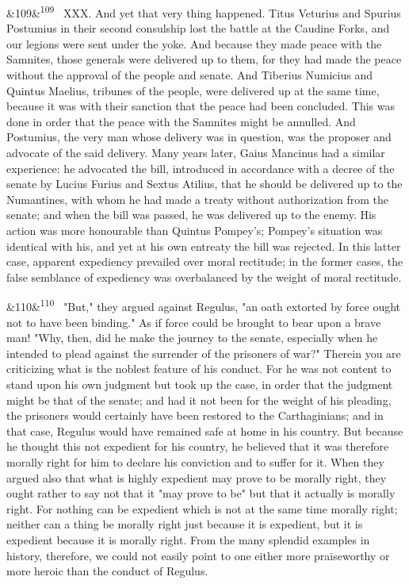 \documentclass[12pt]{article}
\newcommand{\para}[1][]{\par\noindent\ifx&#1&\else\textsuperscript{\footnotesize #1}~\fi}
\begin{document}
\para[109] XXX. And yet that very thing happened. Titus Veturius and Spurius Postumius in their second consulship lost the battle at the Caudine Forks, and our legions were sent under the yoke. And because they made peace with the Samnites, those generals were delivered up to them, for they had made the peace without the approval of the people and senate. And Tiberius Numicius and Quintus Maelius, tribunes of the people, were delivered up at the same time, because it was with their sanction that the peace had been concluded. This was done in order that the peace with the Samnites might be annulled. And Postumius, the very man whose delivery was in question, was the proposer and advocate of the said delivery. Many years later, Gaius Mancinus had a similar experience: he advocated the bill, introduced in accordance with a decree of the senate by Lucius Furius and Sextus Atilius, that he should be delivered up to the Numantines, with whom he had made a treaty without authorization from the senate; and when the bill was passed, he was delivered up to the enemy. His action was more honourable than Quintus Pompey's; Pompey's situation was identical with his, and yet at his own entreaty the bill was rejected. In this latter case, apparent expediency prevailed over moral rectitude; in the former cases, the false semblance of expediency was overbalanced by the weight of moral rectitude.

\para[110] "But," they argued against Regulus, "an oath extorted by force ought not to have been binding." As if force could be brought to bear upon a brave man! "Why, then, did he make the journey to the senate, especially when he intended to plead against the surrender of the prisoners of war?" Therein you are criticizing what is the noblest feature of his conduct. For he was not content to stand upon his own judgment but took up the case, in order that the judgment might be that of the senate; and had it not been for the weight of his pleading, the prisoners would certainly have been restored to the Carthaginians; and in that case, Regulus would have remained safe at home in his country. But because he thought this not expedient for his country, he believed that it was therefore morally right for him to declare his conviction and to suffer for it. When they argued also that what is highly expedient may prove to be morally right, they ought rather to say not that it "may prove to be" but that it actually is morally right. For nothing can be expedient which is not at the same time morally right; neither can a thing be morally right just because it is expedient, but it is expedient because it is morally right. From the many splendid examples in history, therefore, we could not easily point to one either more praiseworthy or more heroic than the conduct of Regulus.
\end{document}
